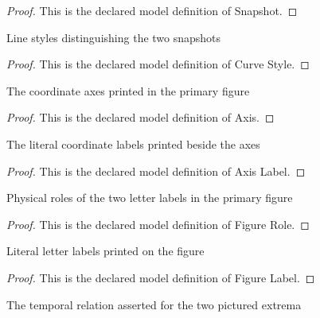 \begin{proof}
  This is the declared model definition of Snapshot.
\end{proof}
\begin{definition}
  \label{def:physics:phyx-mini-0297:phyxminiproblems-problemphyxmini0297-curvestyle}
  Line styles distinguishing the two snapshots
\end{definition}
\begin{proof}
  This is the declared model definition of Curve Style.
\end{proof}
\begin{definition}[Axis]
  \label{def:physics:phyx-mini-0297:phyxminiproblems-problemphyxmini0297-axis}
  The coordinate axes printed in the primary figure
\end{definition}
\begin{proof}
  This is the declared model definition of Axis.
\end{proof}
\begin{definition}
  \label{def:physics:phyx-mini-0297:phyxminiproblems-problemphyxmini0297-axislabel}
  The literal coordinate labels printed beside the axes
\end{definition}
\begin{proof}
  This is the declared model definition of Axis Label.
\end{proof}
\begin{definition}
  \label{def:physics:phyx-mini-0297:phyxminiproblems-problemphyxmini0297-figurerole}
  Physical roles of the two letter labels in the primary figure
\end{definition}
\begin{proof}
  This is the declared model definition of Figure Role.
\end{proof}
\begin{definition}
  \label{def:physics:phyx-mini-0297:phyxminiproblems-problemphyxmini0297-figurelabel}
  Literal letter labels printed on the figure
\end{definition}
\begin{proof}
  This is the declared model definition of Figure Label.
\end{proof}
\begin{definition}
  \label{def:physics:phyx-mini-0297:phyxminiproblems-problemphyxmini0297-snapshotrelation}
  The temporal relation asserted for the two pictured extrema
\end{definition}
